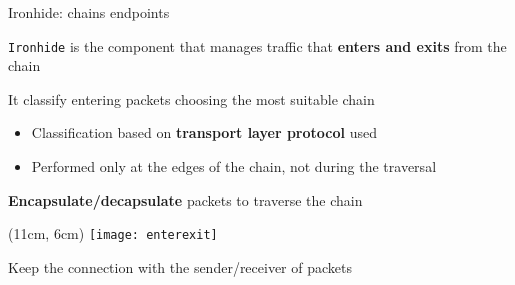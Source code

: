 \begin{frame}{Ironhide: chains endpoints}

  \texttt{Ironhide} is the component that manages traffic that \textbf{enters
  and exits} from the chain

  \vfill{}

  It classify entering packets choosing the most suitable chain
  \begin{itemize}
    \item Classification based on \textbf{transport layer protocol} used
    \item Performed only at the edges of the chain, not during the traversal
  \end{itemize}

  \vfill{}

  \textbf{Encapsulate/decapsulate} packets to traverse the chain

  \begin{textblock*}{1cm}(11cm, 6cm)
    \texttt{[image: enterexit]}
  \end{textblock*}

  \vfill{}

  Keep the connection with the sender/receiver of packets

\end{frame}